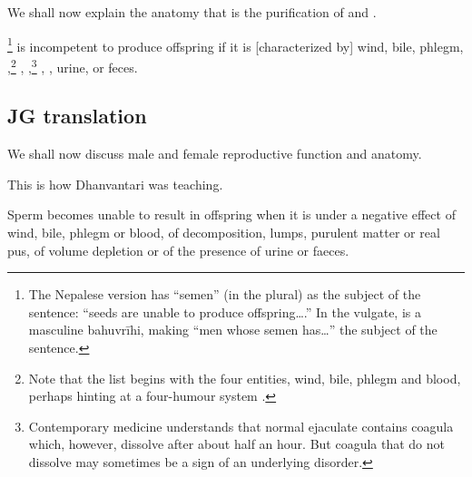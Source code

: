 \begin{translation}
    
    \item [1] We shall now explain the anatomy that is the purification of 
     and 
    .
    
    
    \item [3]  \footnote{The Nepalese version has
     “semen” (in the plural) as the subject of the sentence: “seeds 
    are
    unable to produce offspring\ldots.”  In the vulgate, 
    is a masculine bahuvrīhi, making “men whose semen has\ldots” the
    subject of the sentence.} is incompetent to produce offspring if it
    is [characterized by] wind, bile, phlegm,
    ,\footnote{Note that the list begins with the
        four entities, wind, bile, phlegm and blood, perhaps hinting at a
        four-humour system \citep[see][485--486]{wuja-2000}.}
        ,
        ,\footnote{Contemporary medicine understands
            that normal ejaculate contains coagula which, however, dissolve after
            about half an hour.  But coagula that do not dissolve may sometimes
            be a sign of an underlying disorder.} , , urine, or feces.
    
 
\subsection{JG translation}             
 
 \item[1]
 
  We shall now discuss male and female reproductive function and anatomy.
 
\item[2]
 
  This is how Dhanvantari was teaching.
 
 \item[3]
 
  Sperm becomes unable to result in offspring when it is under a negative effect 
  of wind, bile, phlegm or blood, of decomposition, lumps, purulent matter or real 
  pus, of volume depletion or of the presence of urine or faeces.
 

\end{translation}
